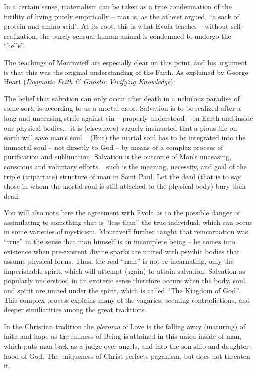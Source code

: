 In a certain sense, materialism can be taken as a true condemnation of the futility of living purely empirically -- man is, as the atheist argued, ``a sack of protein and amino acid''. At its root, this is what Evola teaches -- without self-realization, the purely sensual human animal is condemned to undergo the ``hells''.

The teachings of Mouravieff are especially clear on this point, and his argument is that this was the original understanding of the Faith. As explained by George Heart (\textit{Dogmatic Faith \& Gnostic Vivifying Knowledge}):

\begin{quotex}
The belief that salvation can only occur after death in a nebulous paradise of some sort, is according to us a mortal error. Salvation is to be realized after a long and unceasing strife against sin -- properly understood -- on Earth and inside our physical bodies... it is (elsewhere) vaguely insinuated that a pious life on earth will save man's soul... (But) the mortal soul has to be integrated into the immortal soul -- not directly to God -- by means of a complex process of purification and sublimation. Salvation is the outcome of Man's unceasing, conscious and voluntary efforts... such is the meaning, necessity, and goal of the triple (tripartate) structure of man in Saint Paul. Let the dead (that is to say those in whom the mortal soul is still attached to the physical body) bury their dead.
\end{quotex}


You will also note here the agreement with Evola as to the possible danger of assimilating to something that is ``less than'' the true individual, which can occur in some varieties of mysticism. Mouraveiff further taught that reincarnation was ``true'' in the sense that man himself is an incomplete being -- he comes into existence when pre-existent divine sparks are united with psychic bodies that assume physical forms. Thus, the real ``man'' is not re-incarnating, only the imperishable spirit, which will attempt (again) to attain salvation. Salvation as popularly understood in an exoteric sense therefore occurs when the body, soul, and spirit are united under the spirit, which is called ``The Kingdom of God''. This complex process explains many of the vagaries, seeming contradictions, and deeper similiarities among the great traditions.

In the Christian tradition the \emph{pleroma} of Love is the falling away (maturing) of faith and hope as the fullness of Being is attained in this union inside of man, which puts man back as a judge over angels, and into the son-ship and daughter-hood of God. The uniqueness of Christ perfects paganism, but does not threaten it.

